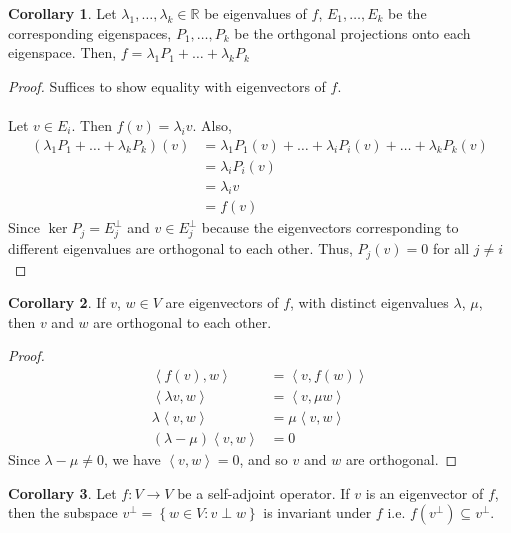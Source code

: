 \documentclass[letterpaper,12pt]{article}
\theoremstyle{definition}
\newtheorem*{corollary}{Corollary}
\newcommand{\set}[1]{\left\{ #1 \right\}}
\newcommand{\inp}[2]{\left< #1, #2 \right>}
\begin{document}
\begin{corollary}
Let $\lambda_1, \dots, \lambda_k \in \mathbb{R}$ be eigenvalues of $f$, $E_1, \dots, E_k$ be the corresponding eigenspaces, $P_1, \dots, P_k$ be the orthgonal projections onto each eigenspace. Then, $f = \lambda_1 P_1 + \dots + \lambda_k P_k$
\end{corollary}
\begin{proof}
Suffices to show equality with eigenvectors of $f$.
\\ \\ Let $v \in E_{i}$. Then $f(v) = \lambda_i v$. Also,
\begin{align*}
    (\lambda_1 P_1 + \dots + \lambda_k P_k)(v) & = \lambda_1 P_1(v) + \dots + \lambda_i P_i(v) + \dots + \lambda_k P_k(v) \\
    & = \lambda_i P_i(v) \\
    & = \lambda_i v \\
    & = f(v)
\end{align*}
Since $\ker{P_j} = E_{j}^{\perp}$ and $v \in E_{j}^{\perp}$ because the eigenvectors corresponding to different eigenvalues are orthogonal to each other. Thus, $P_{j}(v) = 0$ for all $j \neq i$
\end{proof}


\begin{corollary}
If $v$, $w \in V$ are eigenvectors of $f$, with distinct eigenvalues $\lambda$, $\mu$, then $v$ and $w$ are orthogonal to each other.
\end{corollary}
\begin{proof}
\begin{align*}
    \inp{f(v)}{w} & = \inp{v}{f(w)} \\
    \inp{\lambda v}{w} & = \inp{v}{\mu w} \\
    \lambda \inp{v}{w} & = \mu \inp{v}{w} \\
    (\lambda - \mu) \inp{v}{w} & = 0
\end{align*}
Since $\lambda - \mu \neq 0$, we have $\inp{v}{w} = 0$, and so $v$ and $w$ are orthogonal.
\end{proof}

\begin{corollary}
Let $f: V \rightarrow V$ be a self-adjoint operator. If $v$ is an eigenvector of $f$, then the subspace $v^{\perp} = \set{w \in V: v \perp w}$ is invariant under $f$ i.e. $f(v^{\perp}) \subseteq v^{\perp}$.
\end{corollary}
\end{document}

